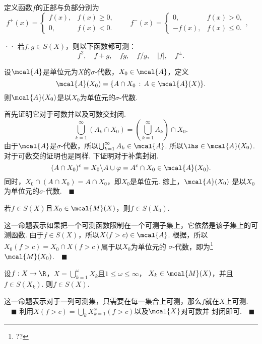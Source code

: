   \begin{defi}
    定义函数$f$的正部与负部分别为
    \[
      f^+(x)=\begin{cases}
        f(x), & f(x)\ge 0,\\
        0,    & f(x) < 0.
      \end{cases}\qquad
      f^-(x)=\begin{cases}
        0,     & f(x) > 0,\\
        -f(x), & f(x) \le 0.
      \end{cases},\quad
    \]
  \end{defi}

  \begin{thm}··
    若$f,g\in S(X)$，则以下函数都可测：
    \[
      f^2,\quad f+g,\quad fg,\quad f/g,\quad |f|,\quad f^{\pm}.
    \]
  \end{thm}

  \begin{lemma}
    \label{lemma: sigma-代数、限制}
    设$\mcal{A}$是单位元为$X$的$\sigma$-代数，$X_0\in\mcal{A}$，定义
    \[
      \mcal{A}(X_0) = \{A\cap X_0\,:\,A\in\mcal{A}(X)\}.
    \]
    则$\mcal{A}(X_0)$是以$X_0$为单位元的$\sigma$-代数.
  \end{lemma}
  \proof
    首先证明它对于可数并以及可数交封闭. 
    \[
      \bigcup_{k=1}^\infty(A_k\cap X_0)= 
      \left(\bigcup_{k=1}^\infty A_k \right)\cap X_0.
    \]
    由于$\mcal{A}$是$\sigma$-代数，所以$\bigcup_{k=1}^\infty A_k\in\mcal{A}$.
    所以$\lhs\in\mcal{A}(X_0)$. 对于可数交的证明也是同样. 下证明对于补集封闭.
    \[
      (A\cap X_0)^c = X_0\backslash A \cup \varphi = A^c\cap X_0\in\mcal{A}(X_0).
    \]
    同时，$X_0\cap(A\cap X_0) = A\cap X_0$，即$X_0$是单位元. 综上，$\mcal{A}(X_0)$
    是以$X_0$为单位元的$\sigma$-代数.$\quad\blacksquare$

  \begin{pos}
    若$f\in S(X)$且$X_0\in\mcal{M}(X)$，则$f\in S(X_0)$.
  \end{pos}
  \remark
    这一命题表示如果把一个可测函数限制在一个可测子集上，它依然是该子集上的可测函数.
  \proof
    由于$f\in S(X)$，所以$X(f>c)\in\mcal{A}$. 根据，所以$X_0(f>c) = X_0\cap X(f>c)$属于以$X_0$为单位元的
    $\sigma$-代数，即为\footnote{??}$\mcal{M}(X_0)$.$\quad\blacksquare$
  
  \begin{thm}
    设$f:X\to\R$，$X=\bigcup_{k=1}^\omega X_k$且$1\le\omega\le\infty$，
    $X_k\in\mcal{M}(X)$，并且$f\in S(X_k)$. 则$f\in S(X)$.
  \end{thm}
  \remark
    这一命题表示对于一列可测集，只需要在每一集合上可测，那么$f$就在$X$上可测.
    $\quad\blacksquare$
  \proof
    利用$X(f>c)=\bigcup_k X_{k=1}^\omega(f>c)$以及$\mcal{X}$对可数并
    封闭即可.$\quad\blacksquare$

